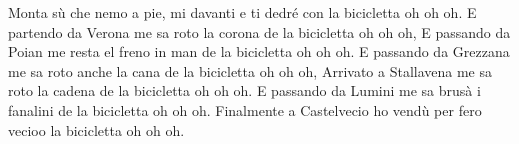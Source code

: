 \beginverse
Monta sù che nemo a pie,
mi davanti e ti dedré
con la bicicletta oh oh oh. 
E partendo da Verona me sa roto la corona
de la bicicletta oh oh oh, 
E passando da Poian me resta el freno in man
de la bicicletta oh oh oh. 
E passando da Grezzana me sa roto anche la cana
de la bicicletta oh oh oh, 
Arrivato a Stallavena me sa roto la cadena
de la bicicletta oh oh oh. 
E passando da Lumini me sa brusà i fanalini
de la bicicletta oh oh oh. 
Finalmente a Castelvecio ho vendù per fero vecioo
la bicicletta oh oh oh. 
\endverse
\endsong
